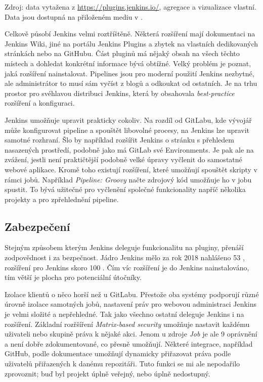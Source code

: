 {\begin{iffigure}
                \caption{Zdroj: data vytažena z \url{https://plugins.jenkins.io/}, agregace a vizualizace vlastní. Data jsou dostupná na přiloženém mediu v .}
            \end{iffigure}
            \clearpage
        }

        Celkově působí Jenkins velmi roztříštěně. Některá rozšíření mají dokumentaci na Jenkins Wiki, jiné na portálu Jenkins Plugins a zbytek na vlastních dedikovaných stránkách nebo na GitHubu. Část pluginů má nějaký obsah na všech těchto místech a dohledat konkrétní informace bývá obtížné. Velký problém je poznat, jaká rozšíření nainstalovat. Pipelines jsou pro moderní použití Jenkins nezbytné, ale administrátor to musí sám vyčíst z blogů a odkoukat od ostatních. Je na trhu prostor pro svéhlavou distribuci Jenkins, která by obsahovala \textit{best-practice} rozšíření a konfiguraci.

        Jenkins umožňuje upravit prakticky cokoliv. Na rozdíl od GitLabu, kde vývojář může konfigurovat pipeline a spouštět libovolné procesy, na Jenkins lze upravit samotné rozhraní. Šlo by například rozšířit Jenkins o stránku s přehledem nasazených prostředí, podobně jako má GitLab své Environments. Je pak ale na zvážení, jestli není praktičtější podobně velké úpravy vyčlenit do samostatné webové aplikace. Kromě toho existují rozšíření, které umožňují spouštět skripty v rámci jobů. Například \textit{Pipeline: Groovy} načte zdrojový kód umožňuje ho v jobu spustit. To bývá užitečné pro vyčlenění společné funkcionality napříč několika projekty a pro zpřehlednění pipeline.

    \subsection{Zabezpečení}
        Stejným způsobem kterým Jenkins deleguje funkcionalitu na pluginy, přenáší zodpovědnost i za bezpečnost. Jádro Jenkins mělo za rok 2018 nahlášeno 53 , rozšíření pro Jenkins skoro 100 \cite{cve-jenkins}. Čím víc rozšíření je do Jenkins nainstalováno, tím větší je plocha pro potenciální útočníky.

        Izolace klientů o něco horší než u GitLabu. Přestože oba systémy podporují různé úrovně izolace samotných jobů, nastavení práv pro webovou administraci Jenkins je velmi složité a nepřehledné. Tak jako všechno ostatní deleguje Jenkins i  na rozšíření. Základní rozřšíření \textit{Matrix-based security} umožňuje nastavit každému uživateli nebo skupině práva k nějaké akci. Jenom u zdroje \textit{Job} je ale 9 oprávnění a není dobře zdokumentované, co přesně umožňují. Některé integrace, například GitHub, podle dokumentace umožňují dynamicky přiřazovat práva podle uživatelů přiřazených k danému repozitáři. Tuto funkci se mi ale nepodařilo zprovoznit; buď byl projekt úplně veřejný, nebo úplně nedostupný.

